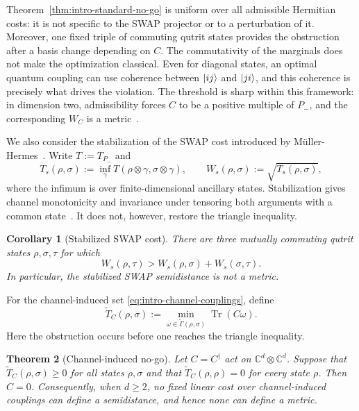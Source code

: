 \documentclass[11pt]{article}
\newtheorem{theorem}{Theorem}[section]
\newtheorem{corollary}[theorem]{Corollary}
\DeclarePairedDelimiter\ket{\lvert}{\rangle}
\begin{document}
Theorem~\ref{thm:intro-standard-no-go} is uniform over all admissible
Hermitian costs: it is not specific to the SWAP projector or to a
perturbation of it.  Moreover, one fixed triple of commuting qutrit states
provides the obstruction after a basis change depending on $C$.  The
commutativity of the marginals does not make the optimization classical.
Even for diagonal states, an optimal quantum coupling can use coherence
between $\ket{ij}$ and $\ket{ji}$, and this coherence is precisely what
drives the violation.  The threshold is sharp within this framework: in
dimension two, admissibility forces $C$ to be a positive multiple of $P_-$,
and the corresponding $W_C$ is a metric~\cite{CEFZ23}.

We also consider the stabilization of the SWAP cost introduced
by M\"uller-Hermes~\cite{Mul22}.  Write $T:=T_{P_-}$ and
\begin{equation}\label{eq:intro-stabilized}
    T_s(\rho,\sigma)
    :=
    \inf_{\gamma}
    T(\rho\otimes\gamma,\sigma\otimes\gamma),
    \qquad
    W_s(\rho,\sigma):=\sqrt{T_s(\rho,\sigma)},
\end{equation}
where the infimum is over finite-dimensional ancillary states.
Stabilization gives channel monotonicity and invariance under tensoring both
arguments with a common state~\cite{Mul22}.  It does not, however, restore
the triangle inequality.

\begin{corollary}[Stabilized SWAP cost]\label{cor:intro-stabilized-no-go}
    There are three mutually commuting qutrit states $\rho,\sigma,\tau$ for
    which
    \[
        W_s(\rho,\tau)
        >
        W_s(\rho,\sigma)+W_s(\sigma,\tau).
    \]
    In particular, the stabilized SWAP semidistance is not a metric.
\end{corollary}

For the channel-induced set \eqref{eq:intro-channel-couplings}, define
\begin{equation}\label{eq:intro-channel-cost}
    \widetilde{T}_C(\rho,\sigma)
    :=
    \min_{\omega\in\widetilde{\Gamma}(\rho,\sigma)}
    \operatorname{Tr}(C\omega).
\end{equation}
Here the obstruction occurs before one reaches the triangle inequality.

\begin{theorem}[Channel-induced no-go]\label{thm:intro-channel-no-go}
    Let $C=C^\dagger$ act on
    $\mathbb{C}^d\otimes\mathbb{C}^d$.  Suppose that
    $\widetilde{T}_C(\rho,\sigma)\geq 0$ for all states $\rho,\sigma$ and that
    $\widetilde{T}_C(\rho,\rho)=0$ for every state $\rho$.  Then $C=0$.
    Consequently, when $d\geq 2$, no fixed linear cost over channel-induced
    couplings can define a semidistance, and hence none can define a metric.
\end{theorem}
\end{document}
